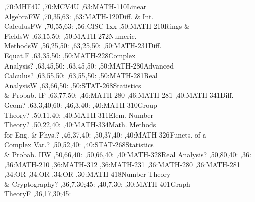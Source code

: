\documentclass{article}
\begin{document}
\thispagestyle{empty}
\begin{chart}
\grid
{},70:{MHF4U}
,70:{MCV4U}
,63:{MATH-110}{Linear\\Algebra}{FW}
  ,70,35,63:
,63:{MATH-120}{Diff. \& Int.\\Calculus}{FW}
  ,70,55,63:
,56:{CISC-1xx}
,50:{MATH-210}{Rings \&\\Fields}{W}
  ,63,15,50:
,50:{MATH-272}{Numeric.\\Methods}{W}
  ,56,25,50:
  ,63,25,50:
,50:{MATH-231}{Diff.\\Equat.}{F}
  ,63,35,50:
,50:{MATH-228}{Complex\\Analysis}{?}
  ,63,45,50:
  ,63,45,50:
,50:{MATH-280}{Advanced\\Calculus}{?}
  ,63,55,50:
  ,63,55,50:
,50:{MATH-281}{Real\\Analysis}{W}
  ,63,66,50:
,50:{STAT-268}{Statistics\\\& Probab. I}{F}
  ,63,77,50:
,46:{MATH-280}
,46:{MATH-281}
,40:{MATH-341}{Diff.\\Geom}{?}
  ,63,3,40;60:
  ,46,3,40:
,40:{MATH-310}{Group\\Theory}{?}
  ,50,11,40:
,40:{MATH-311}{Elem. Number\\Theory}{?}
  ,50,22,40:
,40:{MATH-334}{Math. Methods\\for Eng. \& Phys.}{?}
  ,46,37,40:
  ,50,37,40:
,40:{MATH-326}{Functs. of a\\Complex Var.}{?}
  ,50,52,40:
,40:{STAT-268}{Statistics\\\& Probab. II}{W}
  ,50,66,40:
  ,50,66,40:
,40:{MATH-328}{Real Analysis}{?}
  ,50,80,40:
,36:{}
,36:{MATH-210}
,36:{MATH-312}
,36:{MATH-231}
,36:{MATH-280}
,36:{MATH-281}
,34:{OR}
,34:{OR}
,34:{OR}
,30:{MATH-418}{Number Theory\\\& Cryptography}{?}
  ,36,7,30;45:
  ,40,7,30:
,30:{MATH-401}{Graph\\Theory}{F}
  ,36,17,30;45:

\end{chart}
\end{document}
